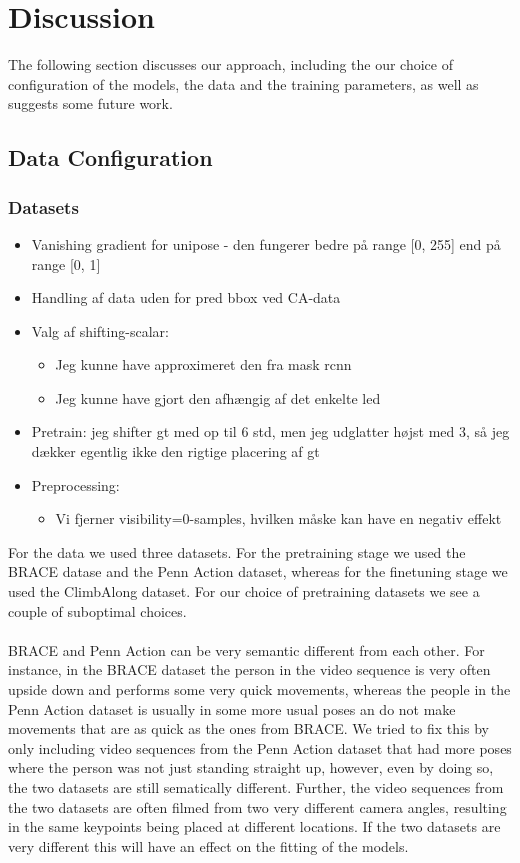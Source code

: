 \documentclass[./main.tex]{subfiles}
\begin{document}
\section{Discussion}
The following section discusses our approach, including the our choice of configuration of the models, the data and the training parameters, as well as suggests some future work.


\subsection{Data Configuration}
\subsubsection{Datasets}
\begin{itemize}
    \item Vanishing gradient for unipose - den fungerer bedre på range [0, 255] end på range [0, 1]
    \item Handling af data uden for pred bbox ved CA-data
    \item Valg af shifting-scalar:
    \begin{itemize}
        \item Jeg kunne have approximeret den fra mask rcnn
        \item Jeg kunne have gjort den afhængig af det enkelte led
    \end{itemize}
    \item Pretrain: jeg shifter gt med op til 6 std, men jeg udglatter højst med 3, så jeg dækker egentlig ikke den rigtige placering af gt
    \item Preprocessing:
    \begin{itemize}
        \item Vi fjerner visibility=0-samples, hvilken måske kan have en negativ effekt
    \end{itemize}
\end{itemize}
For the data we used three datasets. For the pretraining stage we used the BRACE datase and the Penn Action dataset, whereas for the finetuning stage we used the ClimbAlong dataset. For our choice of pretraining datasets we see a couple of suboptimal choices. 
\\
\\
BRACE and Penn Action can be very semantic different from each other. For instance, in the BRACE dataset the person in the video sequence is very often upside down and performs some very quick movements, whereas the people in the Penn Action dataset is usually in some more usual poses an do not make movements that are as quick as the ones from BRACE. We tried to fix this by only including video sequences from the Penn Action dataset that had more poses where the person was not just standing straight up, however, even by doing so, the two datasets are still sematically different. Further, the video sequences from the two datasets are often filmed from two very different camera angles, resulting in the same keypoints being placed at different locations. If the two datasets are very different this will have an effect on the fitting of the models.
\end{document}
